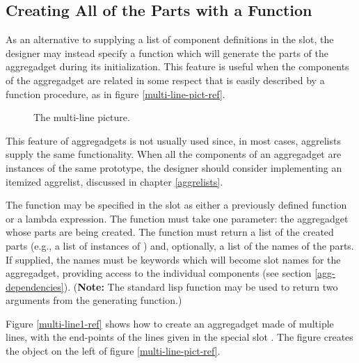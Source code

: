 \begin{group}
\subsection{Creating All of the Parts with a Function}
\label{run-time}

As an alternative to supplying a list of component definitions in the
 slot, the designer may instead specify a function which will
generate the parts of the aggregadget during its initialization.
This feature is useful when the components of the aggregadget are related in
some respect that is easily described by a function procedure, as in figure
\ref{multi-line-pict-ref}.

\vspace{0.25 inch}
\begin{figure}
\begin{center}
\end{center}
\caption{The multi-line picture.}
\end{figure}
\end{group}

This feature of aggregadgets is not usually used since, in most cases,
aggrelists supply the same functionality.  When all the components of an
aggregadget are instances of the same prototype, the designer should
consider implementing an itemized aggrelist, discussed in chapter
\ref{aggrelists}.

The function may be specified in the  slot as either a
previously defined function or a lambda expression.
The function must take one parameter:  the aggregadget whose parts are being
created.  The function must return a list of the created parts (e.g., a
list of instances of ) and,
optionally, a list of the names of the parts.  If supplied, the names must
be keywords
which will become slot names for the aggregadget, providing access to the
individual components (see section \ref{agg-dependencies}).  ({\bf Note:} The
standard lisp function  may be used to return two arguments from the
generating function.)

Figure \ref{multi-line1-ref} shows how to create an aggregadget made
of multiple lines, with the end-points of the lines given in the
special slot .  The figure creates the object on
the left of figure \ref{multi-line-pict-ref}.

